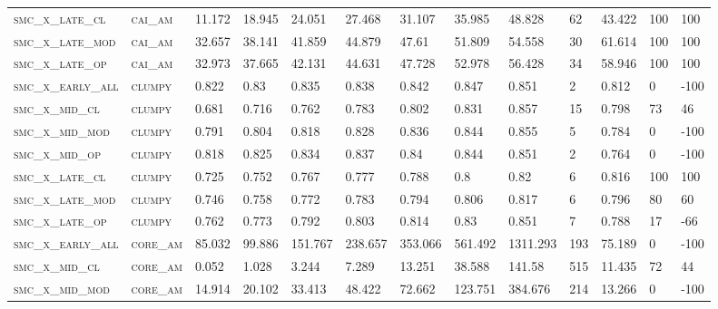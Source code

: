 \begin{landscape}
\begin{center}
\begin{footnotesize}
\begin{longtable}{lllllllllllll}
\textsc{smc\_x\_late\_cl  } & \textsc{cai\_am   }   & 11.172   & 18.945   & 24.051   & 27.468   & 31.107   & 35.985   & 48.828   & 62  & 43.422   & 100 & 100    \\
\textsc{smc\_x\_late\_mod } & \textsc{cai\_am   }   & 32.657   & 38.141   & 41.859   & 44.879   & 47.61    & 51.809   & 54.558   & 30  & 61.614   & 100 & 100    \\
\textsc{smc\_x\_late\_op  } & \textsc{cai\_am   }   & 32.973   & 37.665   & 42.131   & 44.631   & 47.728   & 52.978   & 56.428   & 34  & 58.946   & 100 & 100    \\
\textsc{smc\_x\_early\_all} & \textsc{clumpy    }   & 0.822    & 0.83     & 0.835    & 0.838    & 0.842    & 0.847    & 0.851    & 2   & 0.812    & 0   & -100   \\
\textsc{smc\_x\_mid\_cl   } & \textsc{clumpy    }   & 0.681    & 0.716    & 0.762    & 0.783    & 0.802    & 0.831    & 0.857    & 15  & 0.798    & 73  & 46     \\
\textsc{smc\_x\_mid\_mod  } & \textsc{clumpy    }   & 0.791    & 0.804    & 0.818    & 0.828    & 0.836    & 0.844    & 0.855    & 5   & 0.784    & 0   & -100   \\
\textsc{smc\_x\_mid\_op   } & \textsc{clumpy    }   & 0.818    & 0.825    & 0.834    & 0.837    & 0.84     & 0.844    & 0.851    & 2   & 0.764    & 0   & -100   \\
\textsc{smc\_x\_late\_cl  } & \textsc{clumpy    }   & 0.725    & 0.752    & 0.767    & 0.777    & 0.788    & 0.8      & 0.82     & 6   & 0.816    & 100 & 100    \\
\textsc{smc\_x\_late\_mod } & \textsc{clumpy    }   & 0.746    & 0.758    & 0.772    & 0.783    & 0.794    & 0.806    & 0.817    & 6   & 0.796    & 80  & 60     \\
\textsc{smc\_x\_late\_op  } & \textsc{clumpy    }   & 0.762    & 0.773    & 0.792    & 0.803    & 0.814    & 0.83     & 0.851    & 7   & 0.788    & 17  & -66    \\
\textsc{smc\_x\_early\_all} & \textsc{core\_am  }   & 85.032   & 99.886   & 151.767  & 238.657  & 353.066  & 561.492  & 1311.293 & 193 & 75.189   & 0   & -100   \\
\textsc{smc\_x\_mid\_cl   } & \textsc{core\_am  }   & 0.052    & 1.028    & 3.244    & 7.289    & 13.251   & 38.588   & 141.58   & 515 & 11.435   & 72  & 44     \\
\textsc{smc\_x\_mid\_mod  } & \textsc{core\_am  }   & 14.914   & 20.102   & 33.413   & 48.422   & 72.662   & 123.751  & 384.676  & 214 & 13.266   & 0   & -100   \\

\end{longtable}
\end{footnotesize}
\end{center}
\end{landscape}
